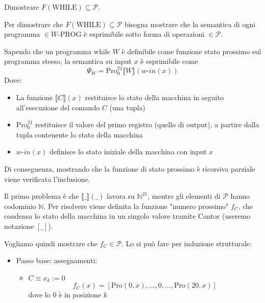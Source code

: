 \documentclass[12pt, answers]{exam}
\theoremstyle{plain}
\newcommand{\while}{\text{WHILE}}
\newcommand{\wprog}{W\text{-PROG}}
\newcommand{\cp}{\mathcal{P}}
\newcommand{\N}{\mathbb{N}}
\newcommand{\pro}{\text{Pro}}
\newcommand{\win}{w\text{-}in}
\begin{document}
\begin{questions}
        \question Dimostrare $F(\while) \subseteq \cp$.
        
        \begin{solution}
            Per dimostrare che $F (\while) \subseteq \cp$ bisogna mostrare che la semantica di ogni programma $\in \wprog$ è esprimibile sotto forma di operazioni $\in \cp$. 
            
            Sapendo che un programma while  $W$ è definibile come funzione stato prossimo sul programma stesso, la semantica su input $x$ è esprimibile come
            $$ \Psi_W = \pro_0^{21} \llbracket W \rrbracket (\win (x)) $$
            Dove: 
            \begin{itemize}
                \item La funzione $\llbracket C \rrbracket (x)$ restituisce lo stato della macchina in seguito all'esecuzione del comando $C$ (una tupla)
                
                \item $\pro_0^{21}$ restituisce il valore del primo registro (quello di output), a partire dalla tupla contenente lo stato della macchina
                
                \item $\win(x)$ definisce lo stato iniziale della macchina con input $x$
            \end{itemize}
            
            Di conseguenza, mostrando che la funzione di stato prossimo è ricorsiva parziale viene verificata l'inclusione. 
            
            Il primo problema è che $\llbracket \_ \rrbracket (\_)$ lavora su $\N^{21}$, mentre gli elementi di $\cp$ hanno codominio $\N$. Per risolvere viene definita la funzione "numero prossimo" $f_C$, che condensa lo stato della macchina in un singolo valore tramite Cantor (useremo notazione $\left[\_\right]$).
            
            Vogliamo quindi mostrare che $f_C \in \cp$. Lo si può fare per induzione strutturale: 
            \begin{itemize}
                \item Passo base: assegnamenti:
                \begin{itemize}
                    \item $C \equiv x_k := 0$
                    $$ f_C (x) = \left[\pro (0, x), \dots, 0, \dots, \pro (20, x) \right] $$
                    dove lo 0 è in posizione $k$
                    

\end{itemize}
\end{itemize}
\end{solution}
\end{questions}
\end{document}
